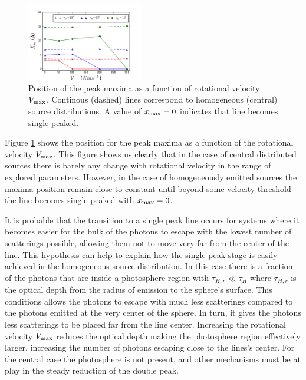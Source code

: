\documentclass[usenatbib]{mn2e}
\begin{document}
\begin{figure}
    \includegraphics[width=0.45\textwidth]{maximumvsVmax.png}
\caption{Position of the peak maxima as a function of rotational
  velocity $V_{\rm max}$. Continous (dashed) lines correspond to
  homogeneous (central) source distributions. A value of $x_{\rm
    max}=0$ indicates that line becomes single
  peaked. \label{fig:maximumsvsvelocity}}  
\end{figure}


Figure \ref{fig:maximumsvsvelocity} shows the position for the peak
maxima as a function of the rotational velocity $V_{\rm max}$. This
figure shows us clearly that in the case of central distributed
sources there is barely any change with rotational velocity in the
range of explored parameters. However, in the case of
homogeneously emitted sources the maxima position remain close to
constant until beyond some velocity threshold the line becomes single
peaked with $x_{\rm max}=0$. 

It is probable that the transition to a single peak line occurs for systems
where it  becomes easier for the bulk of the photons to escape with the lowest
number of scatterings possible, allowing them not to move very far
from the center of the line. This hypothesis can help to explain how the
single peak stage is easily achieved in the homogeneous source
distribution. In this case there is a fraction of the photons that are
inside a photosphere region with $\tau_{H,r}\ll \tau_{H}$ where
$\tau_{H,r}$ is the optical depth from the radius of emission to the
sphere's surface. This conditions allows the photons to escape with
much less scatterings compared to the photons emitted at the very
center of the sphere. In turn, it gives the photons less scatterings
to be placed far from the line center. Increasing the rotational
velocity $V_{\rm max}$ reduces the optical depth making the
photosphere region effectively larger, increasing the number of
photons escaping close to the lines's center. For the central case the
photosphere is not present, and other mechanisms must be at play in
the steady reduction of the double peak. 
\end{document}
